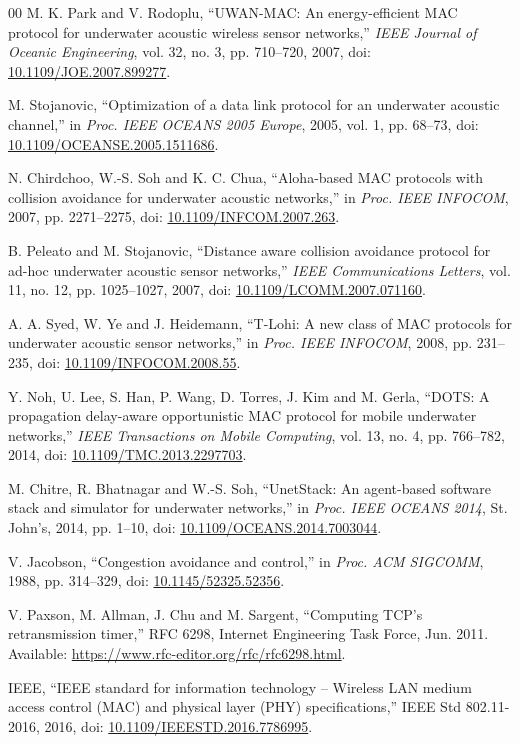 \documentclass{article}
\begin{document}
\begin{thebibliography}{00}
M. K. Park and V. Rodoplu,
``UWAN-MAC: An energy-efficient MAC protocol for underwater acoustic wireless sensor networks,''
\textit{IEEE Journal of Oceanic Engineering}, vol. 32, no. 3, pp. 710--720, 2007, doi: \href{https://doi.org/10.1109/JOE.2007.899277}{10.1109/JOE.2007.899277}.

M. Stojanovic,
``Optimization of a data link protocol for an underwater acoustic channel,''
in \textit{Proc. IEEE OCEANS 2005 Europe}, 2005, vol. 1, pp. 68--73, doi: \href{https://doi.org/10.1109/OCEANSE.2005.1511686}{10.1109/OCEANSE.2005.1511686}.

N. Chirdchoo, W.-S. Soh and K. C. Chua,
``Aloha-based MAC protocols with collision avoidance for underwater acoustic networks,''
in \textit{Proc. IEEE INFOCOM}, 2007, pp. 2271--2275, doi: \href{https://doi.org/10.1109/INFCOM.2007.263}{10.1109/INFCOM.2007.263}.

B. Peleato and M. Stojanovic,
``Distance aware collision avoidance protocol for ad-hoc underwater acoustic sensor networks,''
\textit{IEEE Communications Letters}, vol. 11, no. 12, pp. 1025--1027, 2007, doi: \href{https://doi.org/10.1109/LCOMM.2007.071160}{10.1109/LCOMM.2007.071160}.

A. A. Syed, W. Ye and J. Heidemann,
``T-Lohi: A new class of MAC protocols for underwater acoustic sensor networks,''
in \textit{Proc. IEEE INFOCOM}, 2008, pp. 231--235, doi: \href{https://doi.org/10.1109/INFOCOM.2008.55}{10.1109/INFOCOM.2008.55}.

Y. Noh, U. Lee, S. Han, P. Wang, D. Torres, J. Kim and M. Gerla,
``DOTS: A propagation delay-aware opportunistic MAC protocol for mobile underwater networks,''
\textit{IEEE Transactions on Mobile Computing}, vol. 13, no. 4, pp. 766--782, 2014, doi: \href{https://doi.org/10.1109/TMC.2013.2297703}{10.1109/TMC.2013.2297703}.

M. Chitre, R. Bhatnagar and W.-S. Soh,
``UnetStack: An agent-based software stack and simulator for underwater networks,''
in \textit{Proc. IEEE OCEANS 2014}, St. John's, 2014, pp. 1--10, doi: \href{https://doi.org/10.1109/OCEANS.2014.7003044}{10.1109/OCEANS.2014.7003044}.

V. Jacobson,
``Congestion avoidance and control,''
in \textit{Proc. ACM SIGCOMM}, 1988, pp. 314--329, doi: \href{https://doi.org/10.1145/52325.52356}{10.1145/52325.52356}.

V. Paxson, M. Allman, J. Chu and M. Sargent,
``Computing TCP's retransmission timer,''
RFC 6298, Internet Engineering Task Force, Jun. 2011. Available: \url{https://www.rfc-editor.org/rfc/rfc6298.html}.

IEEE,
``IEEE standard for information technology -- Wireless LAN medium access control (MAC) and physical layer (PHY) specifications,'' IEEE Std 802.11-2016, 2016, doi: \href{https://doi.org/10.1109/IEEESTD.2016.7786995}{10.1109/IEEESTD.2016.7786995}.

\end{thebibliography}
\end{document}
